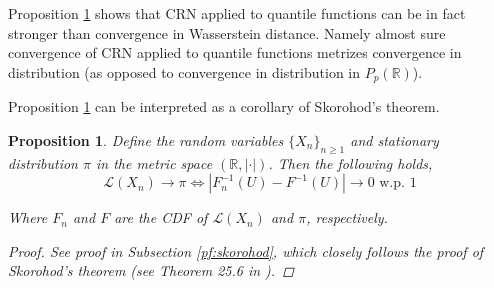 \documentclass[12pt]{article}
\theoremstyle{plain}%
\newtheorem{theorem}{Theorem}[section]
\newtheorem{prop}[theorem]{Proposition}
\theoremstyle{definition}
\newtheorem{remark}{Remark}[section]
\begin{document}
Proposition \ref{thm:equivinv4} shows that CRN applied to quantile functions can be in fact stronger than convergence in Wasserstein distance. Namely almost sure convergence of CRN applied to quantile functions metrizes convergence in distribution (as opposed to convergence in distribution in $P_p(\mathbb{R})$). 


Proposition \ref{thm:equivinv4} can be interpreted as a corollary of Skorohod's theorem. 
\begin{prop}\label{thm:equivinv4}
	Define the random variables $\{X_n\}_{n\geq 1}$ and stationary distribution $\pi$ in the metric space $ (\mathbb{R},|\cdot|)$. Then the following holds, %
	$$\mathcal{L}(X_n)\to \pi \iff
	|F^{-1}_{n}(U)-F^{-1}(U)| \to 0 \text{ w.p. 1}$$
	
	Where $F_{n}$ and $F$ are the CDF of $\mathcal{L}(X_n)$ and $\pi$, respectively.  
	\begin{proof}
		See proof in Subsection \ref{pf:skorohod}, which closely follows the proof of Skorohod's theorem (see Theorem 25.6 in \cite{billingsley}). 
	\end{proof}
\end{prop}

%
%
%
%	 
\end{document}
